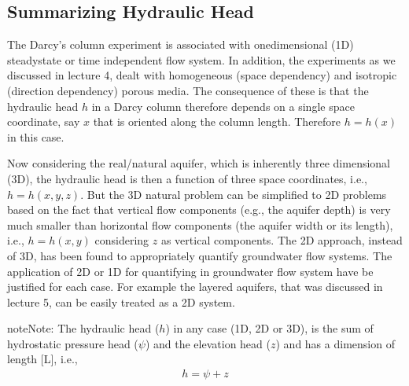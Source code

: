 \documentclass[letterpaper,10pt,english]{jupyterBook}
\begin{document}
\subsection{Summarizing Hydraulic Head}
\label{\detokenize{content/flow/L6/16_darcy_law_3D:summarizing-hydraulic-head}}
\sphinxAtStartPar
The Darcy’s column experiment is associated with one\sphinxhyphen{}dimensional (1D) steady\sphinxhyphen{}state or time independent flow system. In addition, the experiments as we discussed in lecture 4, dealt with homogeneous (space dependency) and isotropic (direction dependency)  porous media. The consequence of these is that the hydraulic head \(h\) in a Darcy column therefore depends on a single space coordinate, say \(x\) that is oriented along the column length. Therefore \(h = h(x)\) in this case.

\sphinxAtStartPar
Now considering the real/natural aquifer, which is inherently three dimensional (3D), the hydraulic head is then a function of three space coordinates, i.e., \(h = h(x,y,z)\). But the 3D natural problem can be simplified to 2D problems based on the fact that vertical flow components (e.g., the aquifer depth) is very much smaller than horizontal flow components (the aquifer width or its length), i.e., \(h = h(x,y)\) considering \(z\) as vertical components. The 2D approach, instead of 3D, has been found to appropriately quantify groundwater flow systems. The application of 2D or 1D for quantifying in groundwater flow system have be justified for each case.  For example the layered aquifers, that was discussed in lecture 5, can be easily treated as a 2D system.

\begin{sphinxadmonition}{note}{Note:}
\sphinxAtStartPar
The hydraulic head (\(h\)) in any case (1D, 2D or 3D), is the sum of hydrostatic pressure head (\(\psi\)) and the elevation head (\(z\)) and has a dimension of length {[}L{]}, i.e.,
\begin{equation*}
\begin{split}
h = \psi + z
\end{split}
\end{equation*}\end{sphinxadmonition}
\end{document}
